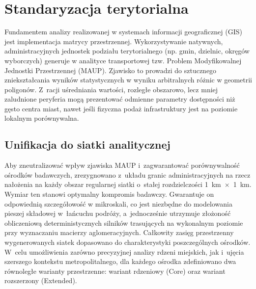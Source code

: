 \documentclass{pracamgr}
\begin{document}
\section{Standaryzacja terytorialna}

Fundamentem analizy realizowanej w systemach informacji geograficznej (GIS) jest implementacja matrycy przestrzennej. Wykorzystywanie natywnych, administracyjnych jednostek podziału terytorialnego (np. gmin, dzielnic, okręgów wyborczych) generuje w analityce transportowej tzw. Problem Modyfikowalnej Jednostki Przestrzennej (MAUP). Zjawisko to prowadzi do sztucznego zniekształcania wyników statystycznych w wyniku arbitralnych różnic w geometrii poligonów. Z~racji uśredniania wartości, rozległe obszarowo, lecz mniej zaludnione peryferia mogą prezentować odmienne parametry dostępności niż gęsto centra miast, nawet jeśli fizyczna podaż infrastruktury jest na poziomie lokalnym porównywalna.

\subsection{Unifikacja do siatki analitycznej}

Aby zneutralizować wpływ zjawiska MAUP i~zagwarantować porównywalność ośrodków badawczych, zrezygnowano z~układu granic administracyjnych na rzecz nałożenia na każdy obszar regularnej siatki o~stałej rozdzielczości 1~km~$\times$~1~km. Wymiar ten stanowi optymalny kompromis badawczy. Gwarantuje on odpowiednią szczegółowość w mikroskali, co jest niezbędne do modelowania pieszej składowej w~łańcuchu podróży, a~jednocześnie utrzymuje złożoność obliczeniową deterministycznych silników trasujących na wykonalnym poziomie przy wyznaczaniu macierzy aglomeracyjnych. Całkowity zasięg przestrzenny wygenerowanych siatek dopasowano do charakterystyki poszczególnych ośrodków. W~celu umożliwienia zarówno precyzyjnej analizy rdzeni miejskich, jak i~ujęcia szerszego kontekstu metropolitalnego, dla każdego ośrodka zdefiniowano dwa równoległe warianty przestrzenne: wariant rdzeniowy (Core) oraz wariant rozszerzony (Extended).
\end{document}
